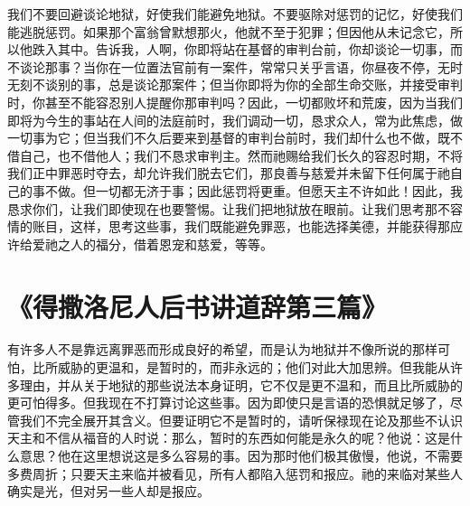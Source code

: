 我们不要回避谈论地狱，好使我们能避免地狱。不要驱除对惩罚的记忆，好使我们能逃脱惩罚。如果那个富翁曾默想那火，他就不至于犯罪；但因他从未记念它，所以他跌入其中。告诉我，人啊，你即将站在基督的审判台前，你却谈论一切事，而不谈论那事？当你在一位置法官前有一案件，常常只关乎言语，你昼夜不停，无时无刻不谈别的事，总是谈论那案件；但当你即将为你的全部生命交账，并接受审判时，你甚至不能容忍别人提醒你那审判吗？因此，一切都败坏和荒废，因为当我们即将为今生的事站在人间的法庭前时，我们调动一切，恳求众人，常为此焦虑，做一切事为它；但当我们不久后要来到基督的审判台前时，我们却什么也不做，既不借自己，也不借他人；我们不恳求审判主。然而祂赐给我们长久的容忍时期，不将我们正中罪恶时夺去，却允许我们脱去它们，那良善与慈爱并未留下任何属于祂自己的事不做。但一切都无济于事；因此惩罚将更重。但愿天主不许如此！因此，我恳求你们，让我们即使现在也要警惕。让我们把地狱放在眼前。让我们思考那不容情的账目，这样，思考这些事，我们既能避免罪恶，也能选择美德，并能获得那应许给爱祂之人的福分，借着恩宠和慈爱，等等。\par



\section{《得撒洛尼人后书讲道辞第三篇》}

\par

\par

有许多人不是靠远离罪恶而形成良好的希望，而是认为地狱并不像所说的那样可怕，比所威胁的更温和，是暂时的，而非永远的；他们对此大加思辨。但我能从许多理由，并从关于地狱的那些说法本身证明，它不仅是更不温和，而且比所威胁的更可怕得多。但我现在不打算讨论这些事。因为即使只是言语的恐惧就足够了，尽管我们不完全展开其含义。但要证明它不是暂时的，请听保禄现在论及那些不认识天主和不信从福音的人时说：那么，暂时的东西如何能是永久的呢？他说：这是什么意思？他在这里想说这是多么容易的事。因为那时他们极其傲慢，他说，不需要多费周折；只要天主来临并被看见，所有人都陷入惩罚和报应。祂的来临对某些人确实是光，但对另一些人却是报应。\par

